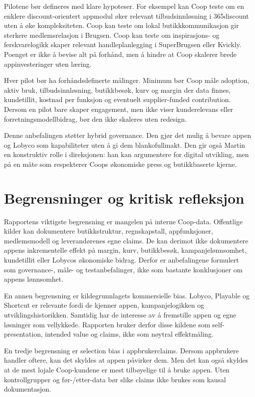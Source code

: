 \documentclass[12pt,a4paper]{article}
\begin{document}
Pilotene bør defineres med klare hypoteser. For eksempel kan Coop teste om en enklere discount-orientert appmodul øker relevant tilbudsinnløsning i 365discount uten å øke kompleksiteten. Coop kan teste om lokal butikkkommunikasjon gir sterkere medlemsrelasjon i Brugsen. Coop kan teste om inspirasjons- og ferskvarelogikk skaper relevant handleplanlegging i SuperBrugsen eller Kvickly. Poenget er ikke å bevise alt på forhånd, men å hindre at Coop skalerer brede appinvesteringer uten læring.

Hver pilot bør ha forhåndsdefinerte målinger. Minimum bør Coop måle adoption, aktiv bruk, tilbudsinnløsning, butikkbesøk, kurv og margin der data finnes, kundetillit, kostnad per funksjon og eventuelt supplier-funded contribution. Dersom en pilot bare skaper engagement, men ikke viser kunderelevans eller forretningsmodellbidrag, bør den ikke skaleres uten redesign.

Denne anbefalingen støtter hybrid governance. Den gjør det mulig å bevare appen og Lobyco som kapabiliteter uten å gi dem blankofullmakt. Den gir også Martin en konstruktiv rolle i direksjonen: han kan argumentere for digital utvikling, men på en måte som respekterer Coops økonomiske press og butikkbaserte kjerne.

\section{Begrensninger og kritisk refleksjon}

Rapportens viktigste begrensning er mangelen på interne Coop-data. Offentlige kilder kan dokumentere butikkstruktur, regnskapstall, appfunksjoner, medlemsmodell og leverandørenes egne claims. De kan derimot ikke dokumentere appens inkrementelle effekt på margin, kurv, butikkbesøk, kampanjelønnsomhet, kundetillit eller Lobycos økonomiske bidrag. Derfor er anbefalingene formulert som governance-, måle- og testanbefalinger, ikke som bastante konklusjoner om appens lønnsomhet.

En annen begrensning er kildegrunnlagets kommersielle bias. Lobyco, Playable og Shortcut er relevante fordi de kjenner appen, kampanjelogikken og utviklingshistorikken. Samtidig har de interesse av å fremstille appen og egne løsninger som vellykkede. Rapporten bruker derfor disse kildene som self-presentation, intended value og claims, ikke som nøytral effektmåling.

En tredje begrensning er selection bias i appbrukerclaims. Dersom appbrukere handler oftere, kan det skyldes at appen påvirker dem. Men det kan også skyldes at de mest lojale Coop-kundene er mest tilbøyelige til å bruke appen. Uten kontrollgrupper og før-/etter-data bør slike claims ikke brukes som kausal dokumentasjon.
\end{document}
